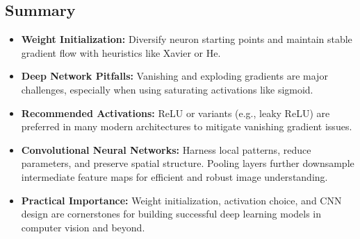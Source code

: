 \documentclass{article}
\begin{document}
\subsection{Summary}
\begin{itemize}
    \item \textbf{Weight Initialization:} Diversify neuron starting points and maintain stable gradient flow with heuristics like Xavier or He.
    \item \textbf{Deep Network Pitfalls:} Vanishing and exploding gradients are major challenges, especially when using saturating activations like sigmoid.
    \item \textbf{Recommended Activations:} ReLU or variants (e.g., leaky ReLU) are preferred in many modern architectures to mitigate vanishing gradient issues.
    \item \textbf{Convolutional Neural Networks:} Harness local patterns, reduce parameters, and preserve spatial structure. Pooling layers further downsample intermediate feature maps for efficient and robust image understanding.
    \item \textbf{Practical Importance:} Weight initialization, activation choice, and CNN design are cornerstones for building successful deep learning models in computer vision and beyond.
\end{itemize}
\end{document}
